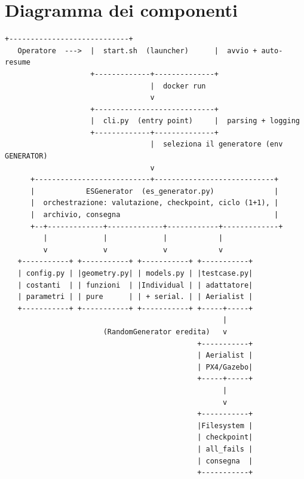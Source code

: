 \documentclass[11pt,a4paper]{report}
\begin{document}
\section{Diagramma dei componenti}
\begin{lstlisting}[style=ascii]
                    +----------------------------+
   Operatore  --->  |  start.sh  (launcher)      |  avvio + auto-resume
                    +-------------+--------------+
                                  |  docker run
                                  v
                    +----------------------------+
                    |  cli.py  (entry point)     |  parsing + logging
                    +-------------+--------------+
                                  |  seleziona il generatore (env GENERATOR)
                                  v
      +---------------------------+----------------------------+
      |            ESGenerator  (es_generator.py)              |
      |  orchestrazione: valutazione, checkpoint, ciclo (1+1), |
      |  archivio, consegna                                    |
      +--+-------------+-------------+------------+-------------+
         |             |             |            |
         v             v             v            v
   +-----------+ +-----------+ +-----------+ +-----------+
   | config.py | |geometry.py| | models.py | |testcase.py|
   | costanti  | | funzioni  | |Individual | | adattatore|
   | parametri | | pure      | | + serial. | | Aerialist |
   +-----------+ +-----------+ +-----------+ +-----+-----+
                                                   |
                       (RandomGenerator eredita)   v
                                             +-----------+
                                             | Aerialist |
                                             | PX4/Gazebo|
                                             +-----+-----+
                                                   |
                                                   v
                                             +-----------+
                                             |Filesystem |
                                             | checkpoint|
                                             | all_fails |
                                             | consegna  |
                                             +-----------+
\end{lstlisting}
\end{document}
